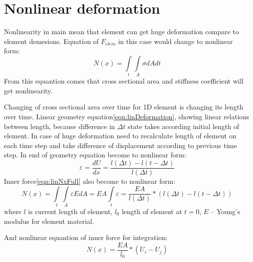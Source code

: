 \section*{Nonlinear deformation}
Nonlinearity in main mean that element can get huge deformation compare to
element demesions. Equation of $F_{elem}$ in this case  would change to
nonlinear form:
\begin{equation}\label{eqn:nonlinNx}
  N(x)= \int\limits_t\int\limits_A \sigma dAdt
\end{equation}
From this equantion comes that cross sectional area and stiffness coefficient
will get nonlinearity.
 \par
Changing of cross sectional area over time for 1D element is changing its length
over time. Linear geometry equation\eqref{eqn:linDeformation}, showing linear
relations between length, because difference in $\Delta t$ state takes according
initial length of element. In case of huge deformation need to recalculate
length of element on each time step and take difference of displacement
according to previous time step. In end of geometry equation become to nonlinear
form:
\begin{equation}\label{eqn:nonlinDeformation}
  \varepsilon=\frac{dU}{dx}=\frac{l(\Delta t)-l(t-\Delta t)}{l(\Delta t)}
\end{equation}
Inner force\eqref{eqn:linNxFull} also become to nonlinear form:
\begin{equation}\label{eqn:nonlinNxFull}
  N(x)= \int\limits_t\int\limits_A \varepsilon EdA=EA\int\limits_t\varepsilon=\frac{EA}{l(\Delta t)}*(l(\Delta t)-l(t-\Delta t))
\end{equation}
where $l$ is current length of element, $l_0$ length of element at $t=0$, $E$ –
Young’s modulus for element material.\par And nonlinear equantion of inner force
for integration:
\begin{equation}\label{eqn:nonlinNxWdispl}
  N(x)=\frac{EA}{l_0}*(U_{i}-U_{j})
\end{equation}\par

